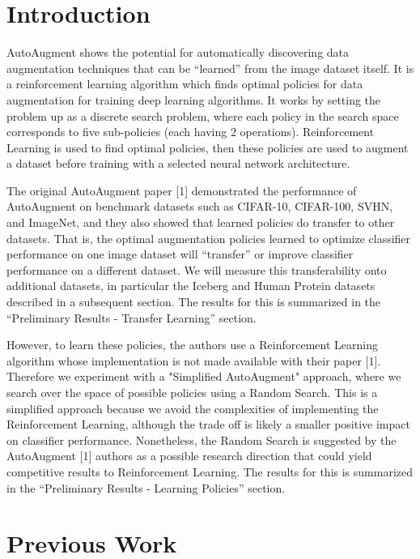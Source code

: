 \documentclass[10pt,twocolumn,letterpaper]{article}
\begin{document}
\section{Introduction}

AutoAugment shows the potential for automatically discovering data augmentation techniques that can be “learned” from the image dataset itself. It is a reinforcement learning algorithm which finds optimal policies for data augmentation for training deep learning algorithms. It works by setting the problem up as a discrete search problem, where each policy in the search space corresponds to five sub-policies (each having 2 operations). Reinforcement Learning is used to find optimal policies, then these policies are used to augment a dataset before training with a selected neural network architecture.

The original AutoAugment paper [1] demonstrated the performance of AutoAugment on benchmark datasets such as CIFAR-10, CIFAR-100, SVHN, and ImageNet, and they also showed that learned policies do transfer to other datasets.   That is, the optimal augmentation policies learned to optimize classifier performance on one image dataset will “transfer” or improve classifier performance on a different dataset.   We will measure this transferability onto additional datasets, in particular the Iceberg and Human Protein datasets described in a subsequent section.  The results for this is summarized in the “Preliminary Results - Transfer Learning” section.

However, to learn these policies, the authors use a Reinforcement Learning algorithm whose implementation is not made available with their paper [1].  Therefore we experiment with a "Simplified AutoAugment" approach, where we search over the space of possible policies using a Random Search.  This is a simplified approach because we avoid the complexities of implementing the Reinforcement Learning, although the trade off is likely a smaller positive impact on classifier performance.  Nonetheless, the Random Search is suggested by the AutoAugment [1] authors as a possible research direction that could yield competitive results to Reinforcement Learning. The results for this is summarized in the “Preliminary Results - Learning Policies” section.

\section{Previous Work}
\end{document}

